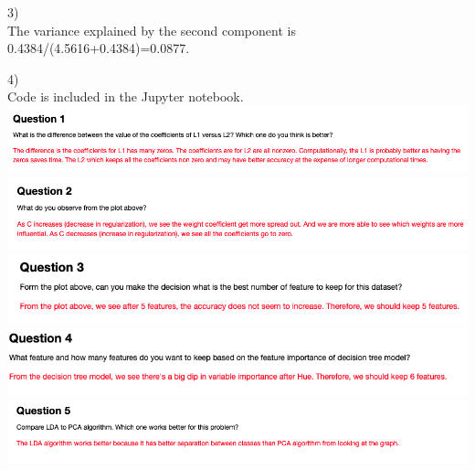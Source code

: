 \documentclass[11pt]{article}
\begin{document}
3) \\
The variance explained by the second component is 0.4384/(4.5616+0.4384)=0.0877.

4) \\

Code is included in the Jupyter notebook. \\

\includegraphics[scale=0.33]{Q1} \\
\includegraphics[scale=0.33]{Q2} \\
\includegraphics[scale=0.33]{Q3} \\
\includegraphics[scale=0.33]{Q4} \\
\includegraphics[scale=0.33]{Q5} \\
\end{document}

